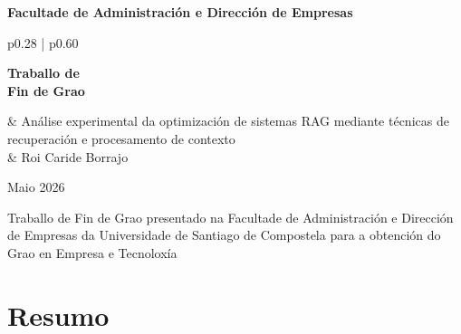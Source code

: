 \documentclass[11pt, a4paper, oneside]{report}
\begin{document}

\hypersetup{pageanchor=false}
\begin{titlepage}
  \thispagestyle{empty}
  \centering

  \vspace*{1cm}

  {\large\bfseries Facultade de Administración e Dirección de Empresas\par}

  \vspace{2.5cm}

  \noindent
  \begin{tabular}{p{0.28\textwidth} | p{0.60\textwidth}}
    \parbox[t]{\linewidth}{\large\bfseries Traballo de\\[4pt] Fin de Grao} &
    {\fontsize{22}{28}\selectfont
      Análise experimental da optimización de sistemas RAG
      mediante técnicas de recuperación e procesamento de contexto}\\[16pt]
    & {\normalsize Roi Caride Borrajo}
  \end{tabular}

  \vspace{2.5cm}

  {\large Maio 2026\par}

  \vfill

  {\small
    Traballo de Fin de Grao presentado na Facultade de Administración e
    Dirección de Empresas da Universidade de Santiago de Compostela para
    a obtención do Grao en Empresa e Tecnoloxía\par}
\end{titlepage}
\hypersetup{pageanchor=true}

\chapter*{Resumo}
\end{document}
